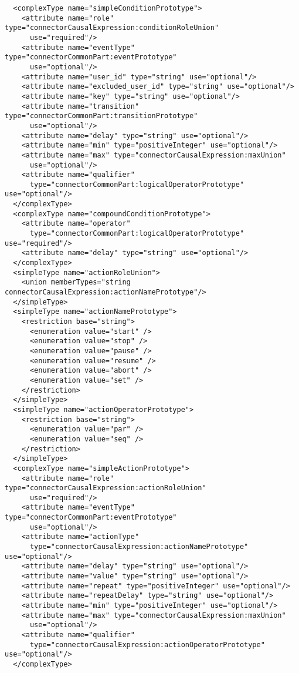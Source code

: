 \begin{listing}[t]
\begin{verbatim}
  <complexType name="simpleConditionPrototype">
    <attribute name="role" type="connectorCausalExpression:conditionRoleUnion"
      use="required"/>
    <attribute name="eventType" type="connectorCommonPart:eventPrototype"
      use="optional"/>
    <attribute name="user_id" type="string" use="optional"/>
    <attribute name="excluded_user_id" type="string" use="optional"/>
    <attribute name="key" type="string" use="optional"/>
    <attribute name="transition" type="connectorCommonPart:transitionPrototype"
      use="optional"/>
    <attribute name="delay" type="string" use="optional"/>
    <attribute name="min" type="positiveInteger" use="optional"/>
    <attribute name="max" type="connectorCausalExpression:maxUnion"
      use="optional"/>
    <attribute name="qualifier"
      type="connectorCommonPart:logicalOperatorPrototype" use="optional"/>
  </complexType>
  <complexType name="compoundConditionPrototype">
    <attribute name="operator"
      type="connectorCommonPart:logicalOperatorPrototype" use="required"/>
    <attribute name="delay" type="string" use="optional"/>
  </complexType>
  <simpleType name="actionRoleUnion">
    <union memberTypes="string connectorCausalExpression:actionNamePrototype"/>
  </simpleType>
  <simpleType name="actionNamePrototype">
    <restriction base="string">
      <enumeration value="start" />
      <enumeration value="stop" />
      <enumeration value="pause" />
      <enumeration value="resume" />
      <enumeration value="abort" />
      <enumeration value="set" />
    </restriction>
  </simpleType>
  <simpleType name="actionOperatorPrototype">
    <restriction base="string">
      <enumeration value="par" />
      <enumeration value="seq" />
    </restriction>
  </simpleType>
  <complexType name="simpleActionPrototype">
    <attribute name="role" type="connectorCausalExpression:actionRoleUnion"
      use="required"/>
    <attribute name="eventType" type="connectorCommonPart:eventPrototype"
      use="optional"/>
    <attribute name="actionType"
      type="connectorCausalExpression:actionNamePrototype" use="optional"/>
    <attribute name="delay" type="string" use="optional"/>
    <attribute name="value" type="string" use="optional"/>
    <attribute name="repeat" type="positiveInteger" use="optional"/>
    <attribute name="repeatDelay" type="string" use="optional"/>
    <attribute name="min" type="positiveInteger" use="optional"/>
    <attribute name="max" type="connectorCausalExpression:maxUnion"
      use="optional"/>
    <attribute name="qualifier"
      type="connectorCausalExpression:actionOperatorPrototype" use="optional"/>
  </complexType>

\end{verbatim}
\end{listing}

